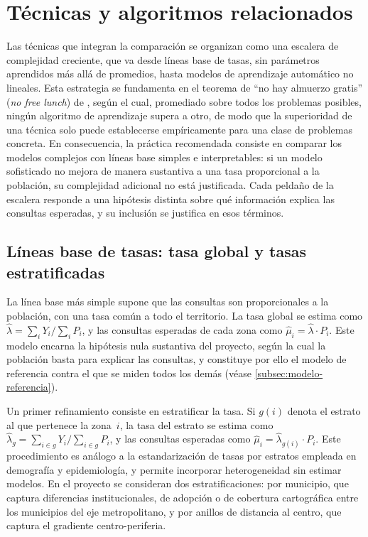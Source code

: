 \section{Técnicas y algoritmos relacionados}
\label{sec:tecnicas-algoritmos}

Las técnicas que integran la comparación se organizan como una escalera de complejidad
creciente, que va desde líneas base de tasas, sin parámetros aprendidos más allá de
promedios, hasta modelos de aprendizaje automático no lineales. Esta estrategia se
fundamenta en el teorema de \enquote{no hay almuerzo gratis} (\textit{no free lunch}) de
\textcite{wolpert1996}, según el cual, promediado sobre todos los problemas posibles, ningún
algoritmo de aprendizaje supera a otro, de modo que la superioridad de una técnica solo
puede establecerse empíricamente para una clase de problemas concreta. En consecuencia, la
práctica recomendada consiste en comparar los modelos complejos con líneas base simples e
interpretables: si un modelo sofisticado no mejora de manera sustantiva a una tasa
proporcional a la población, su complejidad adicional no está justificada. Cada peldaño de
la escalera responde a una hipótesis distinta sobre qué información explica las consultas
esperadas, y su inclusión se justifica en esos términos.

\subsection{Líneas base de tasas: tasa global y tasas estratificadas}
\label{subsec:lineas-base}

La línea base más simple supone que las consultas son proporcionales a la población, con
una tasa común a todo el territorio. La tasa global se estima como
$\hat{\lambda} = \sum_i Y_i / \sum_i P_i$, y las consultas esperadas de cada zona como
$\hat{\mu}_i = \hat{\lambda} \cdot P_i$. Este modelo encarna la hipótesis nula sustantiva
del proyecto, según la cual la población basta para explicar las consultas, y constituye por
ello el modelo de referencia contra el que se miden todos los demás (véase
\ref{subsec:modelo-referencia}).

Un primer refinamiento consiste en estratificar la tasa. Si $g(i)$ denota el estrato al que
pertenece la zona~$i$, la tasa del estrato se estima como
$\hat{\lambda}_g = \sum_{i \in g} Y_i / \sum_{i \in g} P_i$, y las consultas esperadas como
$\hat{\mu}_i = \hat{\lambda}_{g(i)} \cdot P_i$. Este procedimiento es análogo a la
estandarización de tasas por estratos empleada en demografía y epidemiología, y permite
incorporar heterogeneidad sin estimar modelos. En el proyecto se consideran dos
estratificaciones: por municipio, que captura diferencias institucionales, de adopción o de
cobertura cartográfica entre los municipios del eje metropolitano, y por anillos de
distancia al centro, que captura el gradiente centro-periferia.

